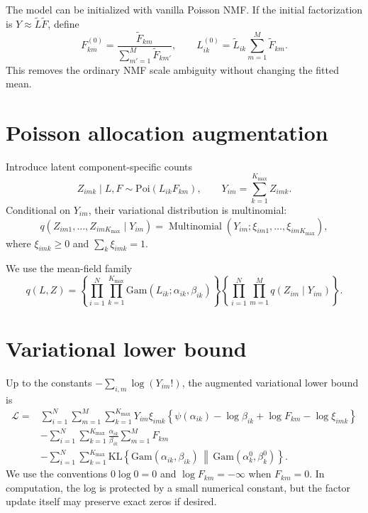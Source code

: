\documentclass[11pt]{article}
\newcommand{\Poi}{\mathrm{Poi}}
\newcommand{\Gam}{\mathrm{Gam}}
\newcommand{\KL}{\mathrm{KL}}
\begin{document}
The model can be initialized with vanilla Poisson NMF.  If the initial
factorization is $Y\approx \widetilde L\widetilde F$, define
\begin{equation}
  F_{km}^{(0)}
  =
  \frac{\widetilde F_{km}}
       {\sum_{m'=1}^M\widetilde F_{km'}},
  \qquad
  L_{ik}^{(0)}
  =
  \widetilde L_{ik}\sum_{m=1}^M\widetilde F_{km}.
  \label{eq:nmf-normalization}
\end{equation}
This removes the ordinary NMF scale ambiguity without changing the fitted
mean.


\section{Poisson allocation augmentation}

Introduce latent component-specific counts
\begin{equation}
  Z_{imk}\mid L,F\sim\Poi(L_{ik}F_{km}),
  \qquad
  Y_{im}=\sum_{k=1}^{K_{\max}}Z_{imk}.
  \label{eq:latent-counts}
\end{equation}
Conditional on $Y_{im}$, their variational distribution is multinomial:
\begin{equation}
  q(Z_{im1},\ldots,Z_{imK_{\max}}\mid Y_{im})
  =
  \operatorname{Multinomial}
  \left(Y_{im};\xi_{im1},\ldots,\xi_{imK_{\max}}\right),
  \label{eq:q-Z}
\end{equation}
where $\xi_{imk}\geq0$ and $\sum_k\xi_{imk}=1$.

We use the mean-field family
\begin{equation}
  q(L,Z)
  =
  \left\{
    \prod_{i=1}^N\prod_{k=1}^{K_{\max}}
    \Gam(L_{ik};\alpha_{ik},\beta_{ik})
  \right\}
  \left\{
    \prod_{i=1}^N\prod_{m=1}^M q(Z_{im}\mid Y_{im})
  \right\}.
  \label{eq:mean-field-family}
\end{equation}


\section{Variational lower bound}

Up to the constants $-\sum_{i,m}\log(Y_{im}!)$, the augmented variational
lower bound is
\begin{align}
  \mathcal L
  ={}&
  \sum_{i=1}^N\sum_{m=1}^M\sum_{k=1}^{K_{\max}}
  Y_{im}\xi_{imk}
  \left\{
    \psi(\alpha_{ik})-\log\beta_{ik}
    +\log F_{km}-\log\xi_{imk}
  \right\}
  \nonumber\\
  &-
  \sum_{i=1}^N\sum_{k=1}^{K_{\max}}
  \frac{\alpha_{ik}}{\beta_{ik}}
  \sum_{m=1}^M F_{km}
  \nonumber\\
  &-
  \sum_{i=1}^N\sum_{k=1}^{K_{\max}}
  \KL\!\left\{
    \Gam(\alpha_{ik},\beta_{ik})
    \,\middle\|\,
    \Gam(\alpha_k^0,\beta_k^0)
  \right\}.
  \label{eq:elbo}
\end{align}
We use the conventions $0\log0=0$ and $\log F_{km}=-\infty$ when
$F_{km}=0$.  In computation, the log is protected by a small numerical
constant, but the factor update itself may preserve exact zeros if desired.
\end{document}
